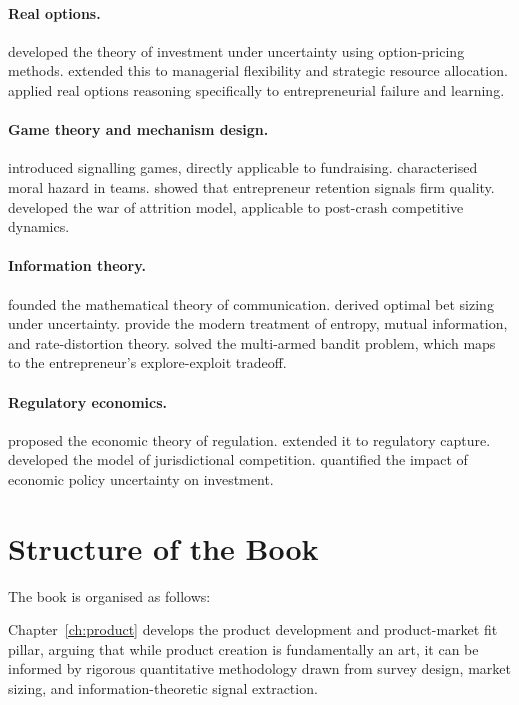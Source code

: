 \documentclass[12pt,a4paper,oneside]{book}
\theoremstyle{definition}
\theoremstyle{remark}
\begin{document}
\paragraph{Real options.} \citet{DixitPindyck1994} developed the theory of investment
under uncertainty using option-pricing methods. \citet{Trigeorgis1996} extended this to
managerial flexibility and strategic resource allocation. \citet{McGrath1999} applied real
options reasoning specifically to entrepreneurial failure and learning.

\paragraph{Game theory and mechanism design.} \citet{Spence1973} introduced signalling
games, directly applicable to fundraising. \citet{Holmstrom1982} characterised moral
hazard in teams. \citet{LelandPyle1977} showed that entrepreneur retention signals firm
quality. \citet{MaynardSmith1974} developed the war of attrition model, applicable to
post-crash competitive dynamics.

\paragraph{Information theory.} \citet{Shannon1948} founded the mathematical theory of
communication. \citet{Kelly1956} derived optimal bet sizing under uncertainty.
\citet{CoverThomas2006} provide the modern treatment of entropy, mutual information, and
rate-distortion theory. \citet{Gittins1979} solved the multi-armed bandit problem, which
maps to the entrepreneur's explore-exploit tradeoff.

\paragraph{Regulatory economics.} \citet{Stigler1971} proposed the economic theory of
regulation. \citet{Peltzman1976} extended it to regulatory capture. \citet{Tiebout1956}
developed the model of jurisdictional competition. \citet{BakerBloomDavis2016} quantified
the impact of economic policy uncertainty on investment.

\section{Structure of the Book}

The book is organised as follows:

Chapter~\ref{ch:product} develops the product development and product-market fit pillar,
arguing that while product creation is fundamentally an art, it can be informed by
rigorous quantitative methodology drawn from survey design, market sizing, and
information-theoretic signal extraction.
\end{document}
